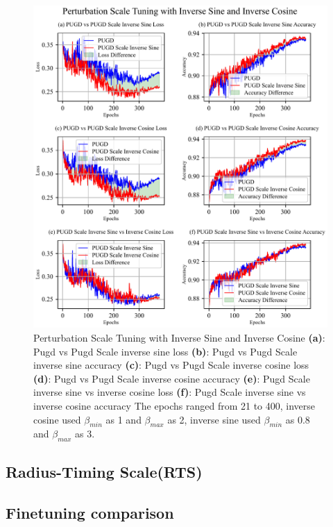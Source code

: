 \documentclass[10pt,twocolumn,letterpaper]{article}
\begin{document}
\begin{figure}[htbp]
	\center
	\vspace{-10pt} 
	\includegraphics[width=\columnwidth]{images/PUGDScaleInv.pdf}
	\caption{Perturbation Scale Tuning with Inverse Sine and Inverse Cosine
	\textbf{(a)}: Pugd vs Pugd Scale inverse sine loss \textbf{(b)}: Pugd vs Pugd Scale inverse sine accuracy
    \textbf{(c)}: Pugd vs Pugd Scale inverse cosine loss \textbf{(d)}: Pugd vs Pugd Scale inverse cosine accuracy
	\textbf{(e)}: Pugd Scale inverse sine vs inverse cosine loss \textbf{(f)}: Pugd Scale inverse sine vs inverse cosine accuracy
	The epochs ranged from 21 to 400, inverse cosine used $\beta_{min}$ as 1 and $\beta_{max}$ as 2, inverse sine used $\beta_{min}$ as 0.8 and $\beta_{max}$ as 3.
	}
	\label{fig:PUGDScaleInv}
\end{figure}




\subsection{Radius-Timing Scale(RTS)}
\label{subsec:4.2}

\subsection{Finetuning comparison}
\label{subsec:4.3}
\end{document}
